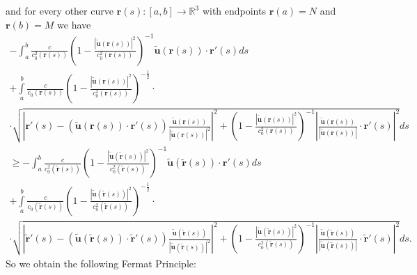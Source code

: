\documentclass{article}
\theoremstyle{definition}
\theoremstyle{remark}
\renewcommand{\vec}[1]{\mathbf{#1}}
\newcommand{\er}{\eqref}
\newcommand{\er}{\eqref}
\begin{document}
and for every other curve $\vec r(s):[a,b]\to\mathbb{R}^3$ with
endpoints $\vec r(a)=N$ and $\vec r(b)=M$ we have
\begin{multline}\label{MaxMedFullGGffgggyyojjhhjkhjyyiuhggjhhjhuyytytyuuytrrtghjtyuggyuighjuyioyyfgffhyuhhghzzrrkkhhkkkhhhjhkjhhhh}
-\int_a^b\frac{c}{c^2_0\left(\vec
r(s)\right)}\left(1-\frac{\left|\vec {\tilde u}\left(\vec
r(s)\right)\right|^2}{c^2_0\left(\vec r(s)\right)}\right)^{-1}\vec
{\tilde u}\left(\vec r(s)\right)\cdot\vec
r'(s)ds\\+\int\limits_a^b\frac{c}{c_0\left(\vec
r(s)\right)}\left(1-\frac{\left|\vec {\tilde u}\left(\vec
r(s)\right)\right|^2}{c^2_0\left(\vec
r(s)\right)}\right)^{-\frac{1}{2}}
\cdot\\
\cdot\sqrt{\left|\vec r'(s)-\left(\vec {\tilde u}\left(\vec
r(s)\right)\cdot\vec r'(s)\right)\frac{\vec {\tilde u}\left(\vec
r(s)\right)}{\left|\vec {\tilde u}\left(\vec
r(s)\right)\right|^2}\right|^2+\left(1-\frac{\left|\vec {\tilde
u}\left(\vec r(s)\right)\right|^2}{c^2_0\left(\vec
r(s)\right)}\right)^{-1}\left|\frac{\vec {\tilde u}\left(\vec
r(s)\right)}{\left|\vec {\tilde u}\left(\vec
r(s)\right)\right|}\cdot\vec r'(s)\right|^2}ds\\ \geq
-\int_a^b\frac{c}{c^2_0\left(\vec{\tilde
r}(s)\right)}\left(1-\frac{\left|\vec {\tilde u}\left(\vec{\tilde
r}(s)\right)\right|^2}{c^2_0\left(\vec{\tilde
r}(s)\right)}\right)^{-1}\vec {\tilde u}\left(\vec{\tilde
r}(s)\right)\cdot\vec
r'(s)ds\\+\int\limits_a^b\frac{c}{c_0\left(\vec{\tilde
r}(s)\right)}\left(1-\frac{\left|\vec {\tilde u}\left(\vec{\tilde
r}(s)\right)\right|^2}{c^2_0\left(\vec{\tilde
r}(s)\right)}\right)^{-\frac{1}{2}}
\cdot\\
\cdot\sqrt{\left|\vec{\tilde r}'(s)-\left(\vec {\tilde
u}\left(\vec{\tilde r}(s)\right)\cdot\vec{\tilde
r}'(s)\right)\frac{\vec {\tilde u}\left(\vec{\tilde
r}(s)\right)}{\left|\vec {\tilde u}\left(\vec{\tilde
r}(s)\right)\right|^2}\right|^2+\left(1-\frac{\left|\vec {\tilde
u}\left(\vec{\tilde r}(s)\right)\right|^2}{c^2_0\left(\vec{\tilde
r}(s)\right)}\right)^{-1}\left|\frac{\vec {\tilde
u}\left(\vec{\tilde r}(s)\right)}{\left|\vec {\tilde
u}\left(\vec{\tilde r}(s)\right)\right|}\cdot\vec{\tilde
r}'(s)\right|^2}ds.
\end{multline}
So we obtain the following Fermat Principle:
\end{document}
